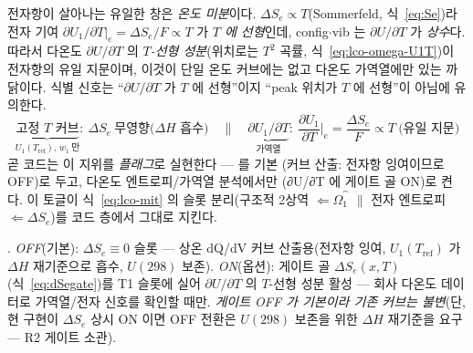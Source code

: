 전자항이 살아나는 유일한 창은 \emph{온도 미분}이다. $\Delta S_e\!\propto\!T$(Sommerfeld, 식~\eqref{eq:Se})라 전자
기여 $\partial U_1/\partial T|_e=\Delta S_e/F\!\propto\!T$ 가 \emph{$T$ 에 선형}인데, config$\cdot$vib 는 $\partial U/\partial T$
가 \emph{상수}다. 따라서 다온도 $\partial U/\partial T$ 의 \emph{$T$-선형 성분}(위치로는 $T^2$ 곡률, 식~\eqref{eq:lco-omega-U1T})이
전자항의 유일 지문이며, 이것이 단일 온도 커브에는 없고 다온도 가역열에만 있는 까닭이다. 식별 신호는
``$\partial U/\partial T$ 가 $T$ 에 선형''이지 ``peak 위치가 $T$ 에 선형''이 아님에 유의한다.
\begin{equation}
\boxed{\;
\underbrace{\text{고정 $T$ 커브}}_{U_1(T_\mathrm{ref}),\,w_1\ \text{만}}\!:\ \Delta S_e\ \text{무영향(}\Delta H\text{ 흡수)}
\quad\Big\|\quad
\underbrace{\partial U_1/\partial T}_{\text{가역열}}\!:\ \frac{\partial U_1}{\partial T}\Big|_e=\frac{\Delta S_e}{F}\propto T\ \text{(유일 지문)}\;}
\label{eq:lco-omega-toggle}
\end{equation}
곧 코드는 이 지위를 \emph{플래그}로 실현한다 ---  를 기본 (커브 산출:
전자항 잉여이므로 OFF)로 두고, 다온도 엔트로피/가역열 분석에서만 (∂U/∂T 에 게이트 골 ON)로 켠다.
이 토글이 식~\eqref{eq:lco-mit} 의 슬롯 분리(구조적 2상역 $\Leftarrow\Omega_1^\cat$ $\|$ 전자 엔트로피
$\Leftarrow\Delta S_e$)를 코드 층에서 그대로 지킨다.
\begin{codebox}
. \emph{OFF}(기본): $\Delta S_e\!\equiv\!0$ 슬롯 --- 상온 dQ/dV
커브 산출용(전자항 잉여, $U_1(T_\mathrm{ref})$ 가 $\Delta H$ 재기준으로 흡수, $U(298)$ 보존). \emph{ON}(옵션):
게이트 골 $\Delta S_e(x,T)$(식~\eqref{eq:dSegate})를 T1 슬롯에 실어 $\partial U/\partial T$ 의 $T$-선형 성분 활성 ---
회사 다온도 데이터로 가역열/전자 신호를 확인할 때만. \emph{게이트 OFF 가 기본이라 기존 커브는 불변}(단, 현
구현이 $\Delta S_e$ 상시 ON 이면 OFF 전환은 $U(298)$ 보존을 위한 $\Delta H$ 재기준을 요구 --- R2 게이트 소관).
\end{codebox}


